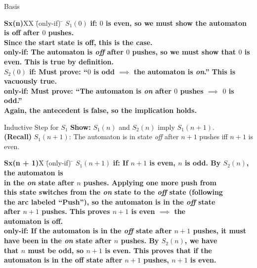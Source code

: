 \begin{wideslide}[bm=,toc=]{Basis}

\begin{tabbing}
{\bf Sx(n)}XX \=  (only-if) \= \kill
{\bf $S_1(0)$}  \>
           \bf{if:} \> 
           $0$ is even, so we must show the automaton is off after $0$ pushes.  \\
      \>\> Since the start state is off, this is the case.  \\[2ex]
      \>
     \bf{only-if:}\> 
          The automaton is {\em off\/} after $0$ pushes, so we must show that $0$ is\\ 
      \>\>   even. This is true by definition.   \\[4ex]
{\bf $S_2(0)$} \>
          \bf{if:} \> 
          Must prove: ``$0$ is odd $\implies$ the automaton is {\em
                   on\/}.'' This is\\
     \>\> vacuously true.  \\[2ex]
     \>
     \bf{only-if:} \> 
       Must prove: ``The automaton is {\em on\/} after $0$ pushes 
                   $\implies$ $0$ is odd.'' \\
     \>\> Again, the antecedent is false, so the implication holds.\\[2ex]
\end{tabbing}


\end{wideslide}

\begin{wideslide}[bm=,toc=]{Inductive Step for $S_1$}
{\bf Show:} $S_1(n)$ and $S_2(n)$ imply $S_1(n + 1)$.\\
{\bf (Recall)} $S_1(n+1)$: The automaton is in state \emph{off} after $n + 1$
pushes iff $n+1$ is even.  
\begin{tabbing}
{\bf Sx(n + 1)}X \=  (only-if) \= \kill
{\bf $S_1(n + 1)$}  \>
           \bf{if:} \> 
           If $n + 1$ is even, $n$ is odd. By $S_2(n)$, the automaton is \\
      \>\> in the \emph{on} state after $n$ pushes. Applying one more push from \\
      \>\> this state switches from the \emph{on} state to the \emph{off} state (following\\
      \>\> the arc labeled ``Push''), so the automaton is in the \emph{off} state \\
      \>\> after $n + 1$ pushes. This proves $n + 1$ is even $\implies$ the  \\
      \>\> automaton is off.
           \\[2ex]
      \>
     \bf{only-if:}\> 
           If the automaton is in the \emph{off} state after $n + 1$ pushes, it must \\
      \>\> have been in the \emph{on} state after $n$ pushes. By $S_2(n)$, we have\\
      \>\> that $n$ must be odd, so $n+1$ is even. This proves that if the \\
      \>\> automaton is in the off state after $n + 1$ pushes, $n+1$ is even.
           \\[2ex]
\end{tabbing}


\end{wideslide}

